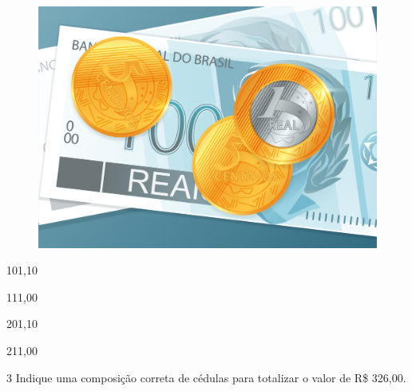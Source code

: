 \begin{figure}[htpb!]
\centering
\includegraphics[width=.5\textwidth]{./media/image79.png}
\end{figure}

\begin{escolha}[itemsep=-5pt]
\item 101,10

\item 111,00

\item 201,10

\item 211,00
\end{escolha}

\pagebreak
\num{3} Indique uma composição correta de cédulas para totalizar o valor de R\$ 326,00.

